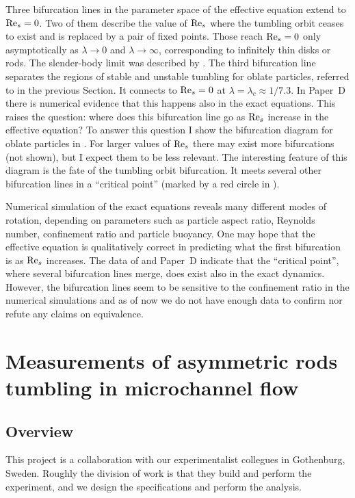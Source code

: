 \documentclass[thesis.tex]{subfiles}
\begin{document}
Three bifurcation lines in the parameter space of the effective equation extend to $\textrm{Re}_s=0$. Two of them describe the value of $\textrm{Re}_s$ where the tumbling orbit ceases to exist and is replaced by a pair of fixed points. Those reach $\textrm{Re}_s=0$ only asymptotically as $\lambda\to0$ and $\lambda\to\infty$, corresponding to infinitely thin disks or rods. The slender-body limit was described by \citet{subramanian2005}. The third bifurcation line separates the regions of stable and unstable tumbling for oblate particles, referred to in the previous Section. It connects to $\textrm{Re}_s=0$ at $\lambda=\lambda_c\approx1/7.3$. In Paper~D there is numerical evidence that this happens also in the exact equations. This raises the question: where does this bifurcation line go as $\textrm{Re}_s$ increase in the effective equation?
To answer this question I show the bifurcation diagram for oblate particles in . For larger values of $\textrm{Re}_s$ there may exist more bifurcations (not shown), but I expect them to be less relevant. The interesting feature of this diagram is the fate of the tumbling orbit bifurcation. It meets several other bifurcation lines in a ``critical point'' (marked by a red circle in ). 

Numerical simulation of the exact equations reveals many different modes of rotation, depending on parameters such as particle aspect ratio, Reynolds number, confinement ratio and particle buoyancy. One may hope that the effective equation is qualitatively correct in predicting what the first bifurcation is as $\textrm{Re}_s$ increases. The data of \citet{rosen2015b} and Paper~D indicate that the ``critical point'', where several bifurcation lines merge, does exist also in the exact dynamics. However, the bifurcation lines seem to be sensitive to the confinement ratio in the numerical simulations and as of now we do not have enough data to confirm nor refute any claims on equivalence.

\raggedbottom\makeatletter
\afterpage{\global\let\@textbottom\relax \global\let\@texttop\relax}

\chapter[Measurements of asymmetric rods]{Measurements of asymmetric rods tumbling in microchannel flow}
\section{Overview}
This project is a collaboration with our experimentalist collegues in Gothenburg, Sweden. Roughly the division of work is that they build and perform the experiment, and we design the specifications and perform the analysis.
\end{document}
